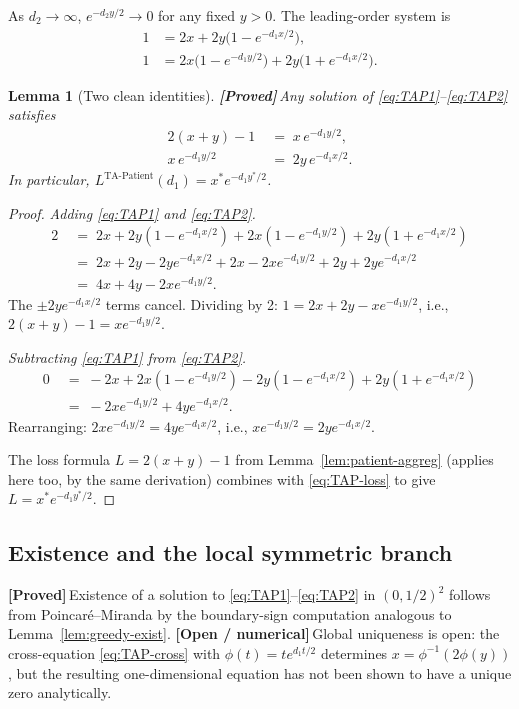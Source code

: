 \documentclass{article}
\theoremstyle{plain}
\newtheorem{lemma}{Lemma}
\theoremstyle{definition}
\newcommand{\proved}{\textcolor{provedgreen}{\textbf{[Proved]}}\,}
\newcommand{\open}{\textcolor{openred}{\textbf{[Open / numerical]}}\,}
\begin{document}
As $d_2\to\infty$, $e^{-d_2 y/2}\to 0$ for any fixed $y>0$. The leading-order system is
\begin{align}
1 &= 2x+2y\bigl(1-e^{-d_1 x/2}\bigr),\label{eq:TAP1}\\
1 &= 2x\bigl(1-e^{-d_1 y/2}\bigr)+2y\bigl(1+e^{-d_1 x/2}\bigr).\label{eq:TAP2}
\end{align}

\begin{lemma}[Two clean identities]\label{lem:TAP-identities}
\proved Any solution of \eqref{eq:TAP1}--\eqref{eq:TAP2} satisfies
\begin{align}
2(x+y)-1 &\;=\; x\,e^{-d_1 y/2},\label{eq:TAP-loss}\\
x\,e^{-d_1 y/2} &\;=\; 2y\,e^{-d_1 x/2}.\label{eq:TAP-cross}
\end{align}
In particular, $L^{\text{TA-Patient}}(d_1)=x^\ast e^{-d_1 y^\ast/2}$.
\end{lemma}

\begin{proof}
\emph{Adding \eqref{eq:TAP1} and \eqref{eq:TAP2}.}
\begin{align*}
2 \;&=\; 2x+2y(1-e^{-d_1 x/2})+2x(1-e^{-d_1 y/2})+2y(1+e^{-d_1 x/2})\\
&=\; 2x+2y-2y e^{-d_1 x/2}+2x-2x e^{-d_1 y/2}+2y+2y e^{-d_1 x/2}\\
&=\; 4x+4y-2x e^{-d_1 y/2}.
\end{align*}
The $\pm 2y e^{-d_1 x/2}$ terms cancel. Dividing by 2: $1=2x+2y-x e^{-d_1 y/2}$, i.e., $2(x+y)-1=x e^{-d_1 y/2}$.

\emph{Subtracting \eqref{eq:TAP1} from \eqref{eq:TAP2}.}
\begin{align*}
0 \;&=\; -2x+2x(1-e^{-d_1 y/2})-2y(1-e^{-d_1 x/2})+2y(1+e^{-d_1 x/2})\\
&=\; -2x e^{-d_1 y/2}+4y e^{-d_1 x/2}.
\end{align*}
Rearranging: $2x e^{-d_1 y/2}=4y e^{-d_1 x/2}$, i.e., $x e^{-d_1 y/2}=2y e^{-d_1 x/2}$.

The loss formula $L=2(x+y)-1$ from Lemma~\ref{lem:patient-aggreg} (applies here too, by the same derivation) combines with \eqref{eq:TAP-loss} to give $L=x^\ast e^{-d_1 y^\ast/2}$.
\end{proof}

\subsection{Existence and the local symmetric branch}

\proved Existence of a solution to \eqref{eq:TAP1}--\eqref{eq:TAP2} in $(0,1/2)^2$ follows from Poincar\'e--Miranda by the boundary-sign computation analogous to Lemma~\ref{lem:greedy-exist}. \open Global uniqueness is open: the cross-equation \eqref{eq:TAP-cross} with $\phi(t)=t e^{d_1 t/2}$ determines $x=\phi^{-1}(2\phi(y))$, but the resulting one-dimensional equation has not been shown to have a unique zero analytically.
\end{document}
